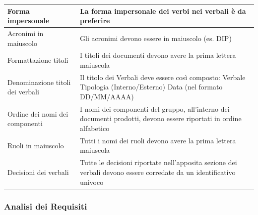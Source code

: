 \documentclass[a4paper,12pt]{article}
\begin{document}
\begin{longtable}{|M{3.5cm}|M{8.5cm}|}
                    Forma impersonale & La forma impersonale dei verbi nei verbali è da preferire \\
                    \hline

                    Acronimi in maiuscolo & Gli acronimi devono essere in maiuscolo (es. DIP) \\
                    \hline

                    Formattazione titoli & I titoli dei documenti devono avere la prima lettera maiuscola \\
                    \hline

                    Denominazione titoli dei verbali & Il titolo dei Verbali deve essere così composto: Verbale Tipologia (Interno/Esterno) Data (nel formato DD/MM/AAAA) \\
                    \hline

                    Ordine dei nomi dei componenti & I nomi dei componenti del gruppo, all’interno dei documenti prodotti, devono essere riportati in ordine alfabetico \\
                    \hline

                    Ruoli in maiuscolo & Tutti i nomi dei ruoli devono avere la prima lettera maiuscola \\
                    \hline

                    Decisioni dei verbali & Tutte le decisioni riportate nell’apposita sezione dei verbali devono essere corredate da un identificativo univoco \\
                    \hline

                \end{longtable}

            \subsubsection{Analisi dei Requisiti}
\end{document}
